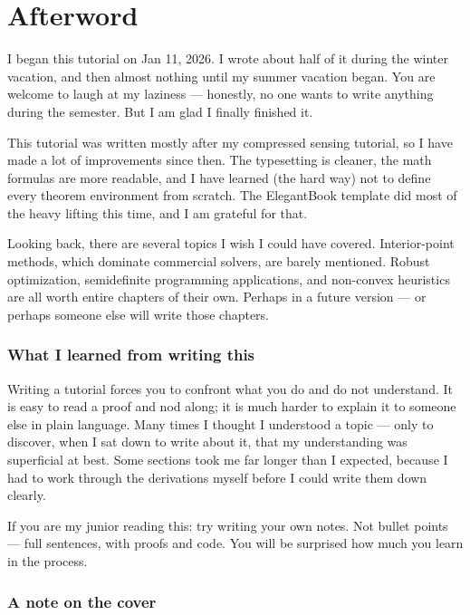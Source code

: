\documentclass[lang=en,color=blue,mode=fancy,titlestyle=hang]{elegantbook}
\begin{document}
\newpage
\chapter*{Afterword}

I began this tutorial on Jan 11, 2026. I wrote about half of it during the winter vacation,
and then almost nothing until my summer vacation began. You are welcome to laugh at my laziness
— honestly, no one wants to write anything during the semester. But I am glad I finally finished it.

This tutorial was written mostly after my compressed sensing tutorial, so I have made a lot of
improvements since then. The typesetting is cleaner, the math formulas are more readable, and
I have learned (the hard way) not to define every theorem environment from scratch. The
ElegantBook template did most of the heavy lifting this time, and I am grateful for that.

Looking back, there are several topics I wish I could have covered. Interior-point methods,
which dominate commercial solvers, are barely mentioned. Robust optimization, semidefinite
programming applications, and non-convex heuristics are all worth entire chapters of their own.
Perhaps in a future version — or perhaps someone else will write those chapters.

\subsection*{What I learned from writing this}

Writing a tutorial forces you to confront what you do and do not understand. It is easy to read
a proof and nod along; it is much harder to explain it to someone else in plain language. Many
times I thought I understood a topic — only to discover, when I sat down to write about it,
that my understanding was superficial at best. Some sections took me far longer than I expected,
because I had to work through the derivations myself before I could write them down clearly.

If you are my junior reading this: try writing your own notes. Not bullet points — full sentences,
with proofs and code. You will be surprised how much you learn in the process.

\subsection*{A note on the cover}
\end{document}
